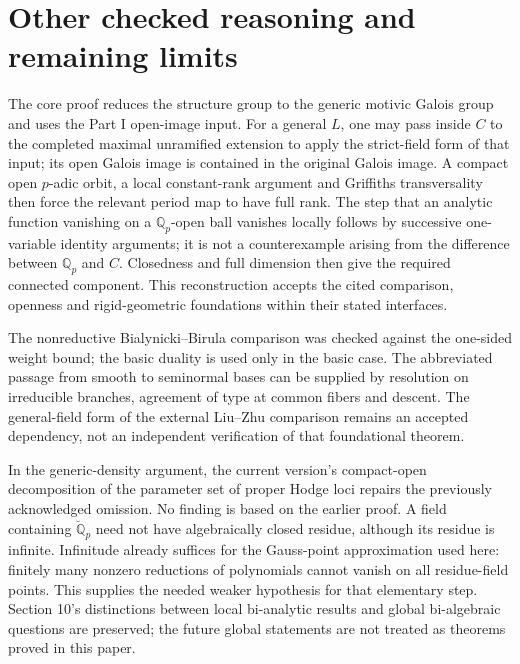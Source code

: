 \documentclass[10pt]{article}
\begin{document}
\section*{Other checked reasoning and remaining limits}
The core proof reduces the structure group to the generic motivic Galois group and uses the Part I open-image input. For a general \(L\), one may pass inside \(C\) to the completed maximal unramified extension to apply the strict-field form of that input; its open Galois image is contained in the original Galois image. A compact open \(p\)-adic orbit, a local constant-rank argument and Griffiths transversality then force the relevant period map to have full rank. The step that an analytic function vanishing on a \(\mathbb Q_p\)-open ball vanishes locally follows by successive one-variable identity arguments; it is not a counterexample arising from the difference between \(\mathbb Q_p\) and \(C\). Closedness and full dimension then give the required connected component. This reconstruction accepts the cited comparison, openness and rigid-geometric foundations within their stated interfaces.\par
The nonreductive Bialynicki–Birula comparison was checked against the one-sided weight bound; the basic duality is used only in the basic case. The abbreviated passage from smooth to seminormal bases can be supplied by resolution on irreducible branches, agreement of type at common fibers and descent. The general-field form of the external Liu–Zhu comparison remains an accepted dependency, not an independent verification of that foundational theorem.\par
In the generic-density argument, the current version’s compact-open decomposition of the parameter set of proper Hodge loci repairs the previously acknowledged omission. No finding is based on the earlier proof. A field containing \(\breve{\mathbb Q}_p\) need not have algebraically closed residue, although its residue is infinite. Infinitude already suffices for the Gauss-point approximation used here: finitely many nonzero reductions of polynomials cannot vanish on all residue-field points. This supplies the needed weaker hypothesis for that elementary step. Section 10’s distinctions between local bi-analytic results and global bi-algebraic questions are preserved; the future global statements are not treated as theorems proved in this paper.\par
\end{document}
